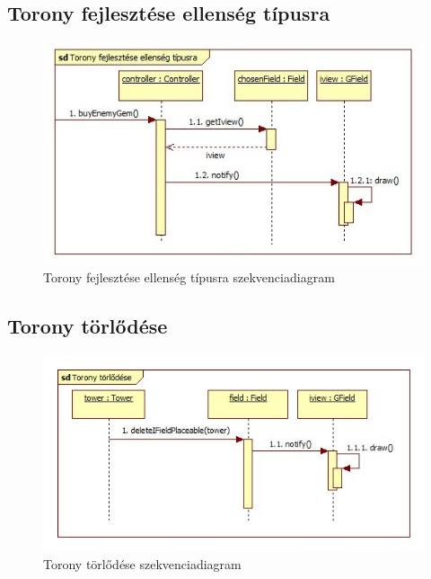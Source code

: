 \subsection{Torony fejlesztése ellenség típusra}
\begin{figure}[H]
\begin{center}
\includegraphics[width=17cm]{chapters/chapter11/images/Torony_fejlesztese_ellenseg_tipusra.jpg}
\caption{Torony fejlesztése ellenség típusra szekvenciadiagram}
\label{fig:Torony_fejlesztese_ellenseg_tipusra}
\end{center}
\end{figure}

\subsection{Torony törlődése}
\begin{figure}[H]
\begin{center}
\includegraphics[width=17cm]{chapters/chapter11/images/Torony_torlodese.jpg}
\caption{Torony törlődése szekvenciadiagram}
\label{fig:Torony_torlodese}
\end{center}
\end{figure}

